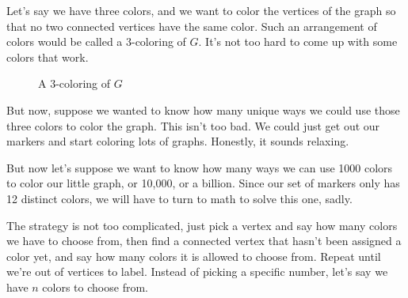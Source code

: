 \documentclass[12pt,oneside]{../../sfsuthesis}
\begin{document}
Let's say we have three colors, and we want to color the vertices of the graph so that no two connected vertices have the same color.
Such an arrangement of colors would be called a 3-coloring of \( G \).
It's not too hard to come up with some colors that work.

\begin{figure}[H]
    \centering
    \caption{A 3-coloring of \(G\)}
\end{figure}

But now, suppose we wanted to know how many unique ways we could use those three colors to color the graph.
This isn't too bad.
We could just get out our markers and start coloring lots of graphs.
Honestly, it sounds relaxing.

But now let's suppose we want to know how many ways we can use 1000 colors to color our little graph, or 10,000, or a billion.
Since our set of markers only has 12 distinct colors, we will have to turn to math to solve this one, sadly.

The strategy is not too complicated, just pick a vertex and say how many colors we have to choose from, then find a connected vertex that hasn't been assigned a color yet, and say how many colors it is allowed to choose from.
Repeat until we're out of vertices to label.
Instead of picking a specific number, let's say we have \( n \) colors to choose from.
\end{document}
